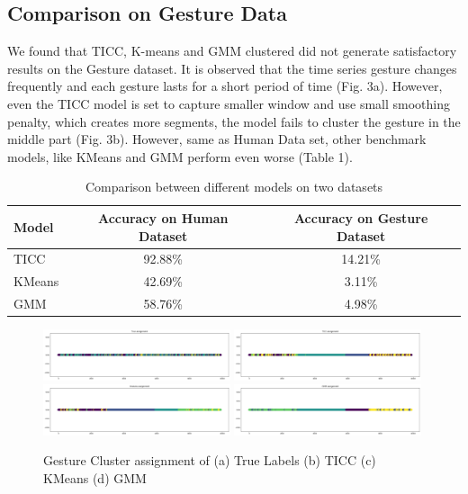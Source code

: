 \documentclass{llncs}
\begin{document}
\subsection{Comparison on Gesture Data}
We found  that TICC, K-means and GMM clustered did not generate satisfactory results on the Gesture dataset. It is observed that the time series gesture changes frequently and each gesture lasts for a short period of time (Fig. 3a). However, even the TICC model is set to capture smaller window and use small smoothing penalty, which creates more segments, the model fails to cluster the gesture in the middle part (Fig. 3b). However, same as Human Data set, other benchmark models, like KMeans and GMM perform even worse (Table 1).
\begin{table}[H]
    \centering
    \begin{tabular}{l|c|c}{\bf Model} & \bf Accuracy on Human Dataset &\bf Accuracy on Gesture Dataset \\
    \hline
    TICC        & 92.88\%  & 14.21\%  \\
    KMeans      & 42.69\%  & 3.11\%   \\
    GMM         & 58.76\%  & 4.98\%   \\
 \end{tabular}
    \caption{Comparison between different models on two datasets}
    \label{tab:acc}
\end{table}

\begin{figure}[H]
    \centering
    \includegraphics[width=0.49\textwidth]{TrueGestures.png}
    \includegraphics[width=0.49\textwidth]{TICC_gesture.png}
    \includegraphics[width=0.49\textwidth]{Kmeans_gesture.png}
    \includegraphics[width=0.49\textwidth]{GMMgesture.png}
    \caption{Gesture Cluster assignment of (a) True Labels (b) TICC (c) KMeans (d) GMM}
    \label{fig:gesture}
\end{figure}
\end{document}
